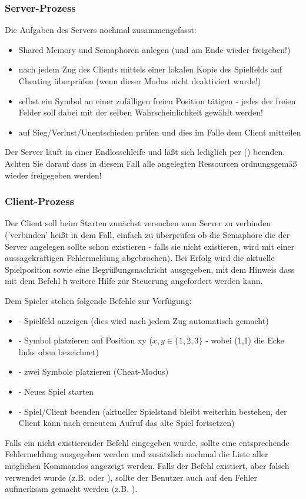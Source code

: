 \subsubsection*{Server-Prozess}
Die Aufgaben des Servers nochmal zusammengefasst:
\begin{itemize}
\item Shared Memory und Semaphoren anlegen (und am Ende wieder freigeben!)
\item nach jedem Zug des Clients mittels einer lokalen Kopie des Spielfelds auf Cheating überprüfen (wenn
  dieser Modus nicht deaktiviert wurde!)
\item selbst ein Symbol an einer zufälligen freien Position tätigen - jedes der freien Felder soll dabei
      mit der selben Wahrscheinlichkeit gewählt werden!
\item auf Sieg/Verlust/Unentschieden prüfen und dies im Falle dem Client mitteilen
\end{itemize}
Der Server läuft in einer Endlosschleife und läßt sich lediglich per
 () beenden. Achten Sie darauf dass in diesem Fall
alle angelegten Ressourcen ordnungsgemäß wieder freigegeben werden!

\subsubsection*{Client-Prozess}
Der Client soll beim Starten zunächst versuchen zum Server zu verbinden
('verbinden' heißt in dem Fall, einfach zu überprüfen ob die Semaphore
die der Server angelegen sollte schon existieren - falls sie nicht existieren,
wird mit einer aussagekräftigen Fehlermeldung abgebrochen). Bei Erfolg wird die aktuelle
Spielposition sowie eine
Begrüßungsnachricht ausgegeben, mit dem Hinweis dass mit dem Befehl \texttt{h}
weitere Hilfe zur Steuerung angefordert werden kann.

Dem Spieler stehen folgende Befehle zur Verfügung:
\begin{itemize}
	\item {} - Spielfeld anzeigen (dies wird nach jedem Zug automatisch gemacht)
	\item {} - Symbol platzieren auf Position xy ($ x,y \in \{1,2,3\} $ - wobei (1,1) die Ecke links oben bezeichnet)
	\item {} - zwei Symbole platzieren (Cheat-Modus)
	\item {} - Neues Spiel starten
	\item {} - Spiel/Client beenden (aktueller Spielstand bleibt weiterhin bestehen, der Client kann nach erneutem Aufruf das alte Spiel fortsetzen)
\end{itemize}
Falls ein nicht existierender Befehl eingegeben wurde, sollte eine entsprechende
Fehlermeldung ausgegeben werden und zusätzlich nochmal die Liste aller möglichen
Kommandos angezeigt werden. Falls der Befehl existiert, aber falsch verwendet wurde
(z.B.  oder ), sollte der Benutzer auch auf den Fehler
aufmerksam gemacht werden (z.B. ).

